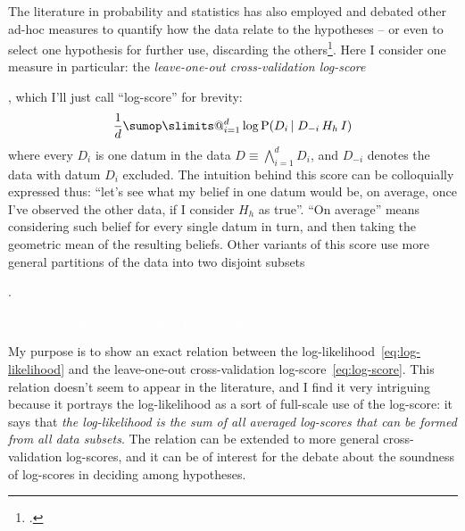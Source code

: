 \documentclass[\ifafour a4paper,12pt,\else a5paper,10pt,\fi%
onecolumn,oneside,article,%
british%
]{memoir}
\makeatletter
\theoremstyle{remark}
\theoremstyle{innote}
\def\sum{\DOTSI\sumop\slimits@}
\newcommand*{\citep}{\footcites}
\newcommand*{\Land}{\bigwedge}
\newcommand*{\p}{\mathrm{P}}%
\renewcommand*{\|}[1][]{\nonscript\,#1\vert\nonscript\;\mathopen{}}
\newcommand*{\sects}{\S\S}%
\newcommand*{\eqn}{eq.}%
\newcommand*{\yK}{I}
\makeatother
\begin{document}
\bigskip

The literature in probability and statistics has also employed and debated
other ad-hoc measures to quantify how the data relate to the hypotheses --
or even to select one hypothesis for further use, discarding the
others\citep[\sects~3.4, 6.1.6 gives the clearest motivation and
explanation]{bernardoetal1994_r2000}[see
also][]{stone1977,geisseretal1979,vehtarietal2012,vehtarietal2002,krnjajicetal2011,krnjajicetal2014,gelmanetal2014,gronauetal2019,chandramoulietal2019}.
Here I consider one measure in particular: the \emph{leave-one-out
  cross-validation log-score}\addtocounter{footnote}{-1}\footnotemark{},
which I'll just call \enquote{log-score} for brevity:
\begin{equation}
  \label{eq:log-score}
  \frac{1}{d} \sum_{i=1}^{d} \log\p(D_{i} \| D_{-i} \, H_{h} \, \yK)
\end{equation}
where every $D_{i}$ is one datum in the data $D \equiv \Land_{i=1}^{d} D_{i}$,
and $D_{-i}$ denotes the data with datum $D_{i}$ excluded. The intuition
behind this score can be colloquially expressed thus: \enquote{let's see
  what my belief in one datum would be, on average, once I've observed the
  other data, if I consider $H_{h}$ as true}. \enquote{On average} means
considering such belief for every single datum in turn, and then taking the
geometric mean of the resulting
beliefs. %
Other variants of this score use more general partitions of the data into
two disjoint subsets\addtocounter{footnote}{-1}\footnotemark{}.

\textcolor{white}{If you find this you can claim a postcard from me.}


My purpose is to show an exact relation between the
log-likelihood~\eqref{eq:log-likelihood} and the leave-one-out
cross-validation log-score~\eqref{eq:log-score}. This relation doesn't seem
to appear in the literature, and I find it very intriguing because it
portrays the log-likelihood as a sort of full-scale use of the log-score:
it says that \emph{the log-likelihood is the sum of all averaged log-scores
  that can be formed from all data subsets}. The relation can be extended
to more general cross-validation log-scores, and it can be of interest for
the debate about the soundness of log-scores in deciding among hypotheses.




\end{document}
